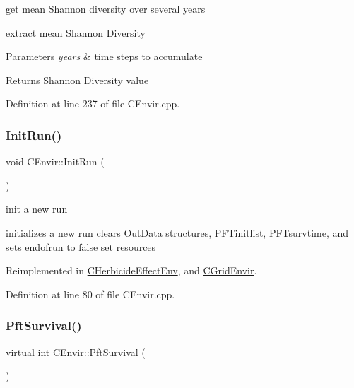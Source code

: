 get mean Shannon diversity over several years 

extract mean Shannon Diversity 
\begin{DoxyParams}{Parameters}
{\em years} & time steps to accumulate \\
\hline
\end{DoxyParams}
\begin{DoxyReturn}{Returns}
Shannon Diversity value 
\end{DoxyReturn}


Definition at line 237 of file C\+Envir.\+cpp.

\mbox{\label{class_c_envir_af361384ae8ac1d909c2be355ecb19987}} 
\subsubsection{\texorpdfstring{InitRun()}{InitRun()}}
{\footnotesize\ttfamily void C\+Envir\+::\+Init\+Run (\begin{DoxyParamCaption}{ }\end{DoxyParamCaption})\hspace{0.3cm}{\ttfamily [virtual]}}



init a new run 

initializes a new run clears Out\+Data structures, P\+F\+Tinitlist, P\+F\+Tsurvtime, and sets endofrun to false set resources 

Reimplemented in \mbox{\hyperlink{class_c_herbicide_effect_env_a307a82e619105086fd02eca98c48f8b6}{C\+Herbicide\+Effect\+Env}}, and \mbox{\hyperlink{class_c_grid_envir_a5db9b9b5fb26f6f6cbc3b3904ace0b68}{C\+Grid\+Envir}}.



Definition at line 80 of file C\+Envir.\+cpp.

\mbox{\label{class_c_envir_a03a7a06d46020790e16f68e52469471a}} 
\subsubsection{\texorpdfstring{PftSurvival()}{PftSurvival()}}
{\footnotesize\ttfamily virtual int C\+Envir\+::\+Pft\+Survival (\begin{DoxyParamCaption}{ }\end{DoxyParamCaption})\hspace{0.3cm}{\ttfamily [pure virtual]}}



